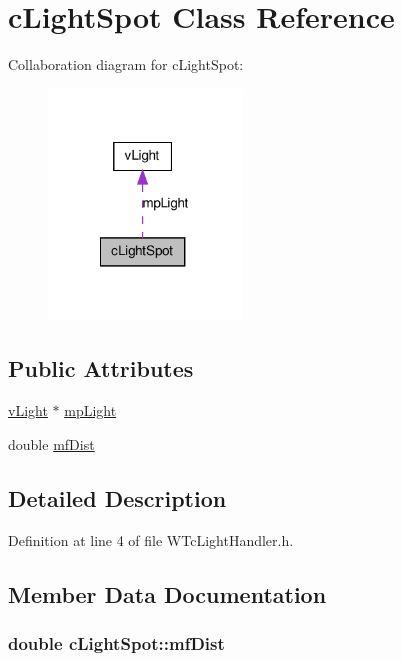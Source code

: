 \hypertarget{classc_light_spot}{
\section{cLightSpot Class Reference}
\label{classc_light_spot}
}


Collaboration diagram for cLightSpot:
\nopagebreak
\begin{figure}[H]
\begin{center}
\leavevmode
\includegraphics[width=146pt]{classc_light_spot__coll__graph}
\end{center}
\end{figure}
\subsection*{Public Attributes}
\begin{DoxyCompactItemize}
\item 
\hyperlink{classv_light}{vLight} $\ast$ \hyperlink{classc_light_spot_ab46df08134a9fdcd89db80b9f023cf52}{mpLight}
\item 
double \hyperlink{classc_light_spot_a1eeeb5aa72c52ae4ce85ab7ca83f6100}{mfDist}
\end{DoxyCompactItemize}


\subsection{Detailed Description}


Definition at line 4 of file WTcLightHandler.h.



\subsection{Member Data Documentation}
\hypertarget{classc_light_spot_a1eeeb5aa72c52ae4ce85ab7ca83f6100}{
\subsubsection[{mfDist}]{\setlength{\rightskip}{0pt plus 5cm}double {\bf cLightSpot::mfDist}}}
\label{classc_light_spot_a1eeeb5aa72c52ae4ce85ab7ca83f6100}


